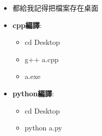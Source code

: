 \begin{itemize}
    \item 都給我記得把檔案存在桌面
    \item \textbf{cpp編譯}:
    \begin{itemize}
        \item cd Desktop
        \item g++ a.cpp
        \item a.exe
    \end{itemize}

    \item \textbf{python編譯}:
    \begin{itemize}
        \item cd Desktop
        \item python a.py
    \end{itemize}
\end{itemize}
